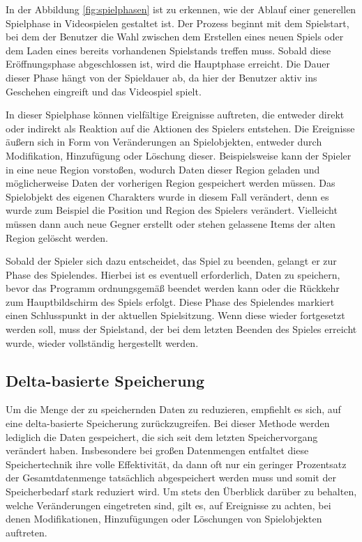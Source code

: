 In der Abbildung \ref{fig:spielphasen} ist zu erkennen, wie der Ablauf einer generellen Spielphase in Videospielen gestaltet ist. Der Prozess beginnt mit dem Spielstart, bei dem der Benutzer die Wahl zwischen dem Erstellen eines neuen Spiels oder dem Laden eines bereits vorhandenen Spielstands treffen muss. Sobald diese Eröffnungsphase abgeschlossen ist, wird die Hauptphase erreicht. Die Dauer dieser Phase hängt von der Spieldauer ab, da hier der Benutzer aktiv ins Geschehen eingreift und das Videospiel spielt.

In dieser Spielphase können vielfältige Ereignisse auftreten, die entweder direkt oder indirekt als Reaktion auf die Aktionen des Spielers entstehen. Die Ereignisse äußern sich in Form von Veränderungen an Spielobjekten, entweder durch Modifikation, Hinzufügung oder Löschung dieser. Beispielsweise kann der Spieler in eine neue Region vorstoßen, wodurch Daten dieser Region geladen und möglicherweise Daten der vorherigen Region gespeichert werden müssen. Das Spielobjekt des eigenen Charakters wurde in diesem Fall verändert, denn es wurde zum Beispiel die Position und Region des Spielers verändert. Vielleicht müssen dann auch neue Gegner erstellt oder stehen gelassene Items der alten Region gelöscht werden. 

Sobald der Spieler sich dazu entscheidet, das Spiel zu beenden, gelangt er zur Phase des Spielendes. Hierbei ist es eventuell erforderlich, Daten zu speichern, bevor das Programm ordnungsgemäß beendet werden kann oder die Rückkehr zum Hauptbildschirm des Spiels erfolgt. Diese Phase des Spielendes markiert einen Schlusspunkt in der aktuellen Spielsitzung. Wenn diese wieder fortgesetzt werden soll, muss der Spielstand, der bei dem letzten Beenden des Spieles erreicht wurde, wieder vollständig hergestellt werden. 


\subsection{Delta-basierte Speicherung} \label{ssect:deltasave}
Um die Menge der zu speichernden Daten zu reduzieren, empfiehlt es sich, auf eine delta-basierte Speicherung zurückzugreifen. Bei dieser Methode werden lediglich die Daten gespeichert, die sich seit dem letzten Speichervorgang verändert haben. Insbesondere bei großen Datenmengen entfaltet diese Speichertechnik ihre volle Effektivität, da dann oft nur ein geringer Prozentsatz der Gesamtdatenmenge tatsächlich abgespeichert werden muss und somit der Speicherbedarf stark reduziert wird. Um stets den Überblick darüber zu behalten, welche Veränderungen eingetreten sind, gilt es, auf Ereignisse zu achten, bei denen Modifikationen, Hinzufügungen oder Löschungen von Spielobjekten auftreten.

